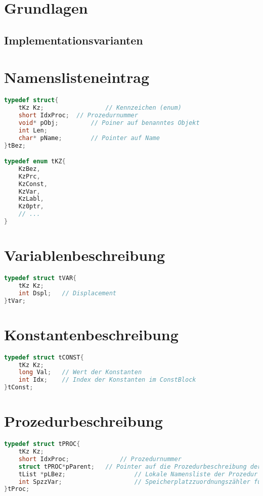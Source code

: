 \section{Grundlagen}
\subsection*{Implementationsvarianten}
\section{Namenslisteneintrag}
\begin{lstlisting}[language=C]
typedef struct{
	tKz Kz;					// Kennzeichen (enum)
	short IdxProc;	// Prozedurnummer
	void* pObj;			// Poiner auf benanntes Objekt
	int Len;				
	char* pName;		// Pointer auf Name
}tBez;

typedef enum tKZ{
	KzBez, 
	KzPrc, 
	KzConst, 
	KzVar, 
	KzLabl, 
	Kz0ptr,
	// ...
}
\end{lstlisting}
\section{Variablenbeschreibung}
\begin{lstlisting}[language=C]
typedef struct tVAR{
	tKz Kz;
	int Dspl;	// Displacement
}tVar;
\end{lstlisting}
\section{Konstantenbeschreibung}
\begin{lstlisting}[language=C]
typedef struct tCONST{
	tKz Kz;
	long Val;	// Wert der Konstanten
	int Idx;	// Index der Konstanten im ConstBlock
}tConst;
\end{lstlisting}
\section{Prozedurbeschreibung}
\begin{lstlisting}[language=C]
typedef struct tPROC{
	tKz Kz;								
	short IdxProc;				// Prozedurnummer
	struct tPROC*pParent;	// Pointer auf die Prozedurbeschreibung der Parentprozedur
	tList *pLBez;					// Lokale Namensliste der Prozedur
	int SpzzVar;					// Speicherplatzzuordnungszähler für Variable
}tProc;
\end{lstlisting}

